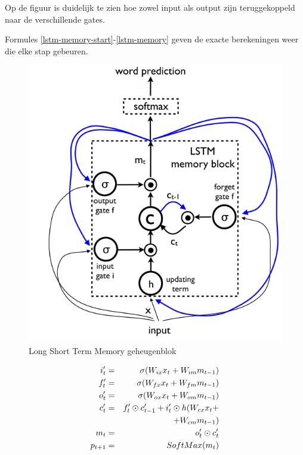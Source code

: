 Op de figuur is duidelijk te zien hoe zowel input als output zijn teruggekoppeld naar de verschillende gates. 

Formules \eqref{lstm-memory-start}-\eqref{lstm-memory} geven de exacte berekeningen weer die elke stap gebeuren. 

\begin{figure}[tb]
    \centering
    \includegraphics[width=\linewidth]{Images/lstm.PNG}
    \caption{Long Short Term Memory geheugenblok}
    \label{fig:lstm}
\end{figure}

\begin{eqnarray}
\vspace{-3mm}
\label{lstm-memory-start}
i_t' & = & \sigma (W_{ix} x_t + W_{im} m_{t-1}) \label{lstm-input} \\
f_t' & = & \sigma (W_{fx} x_t + W_{fm} m_{t-1}) \\
o_t' & = & \sigma (W_{ox} x_t + W_{om} m_{t-1}) \\
c_t' & = & f_t' \odot c_{t-1}' + i_t' \odot h(W_{cx} x_t + \nonumber \\
&   & + W_{cm} m_{t-1}) \\
m_t & = & o_t' \odot c_t'\\
p_{t+1} & = & SoftMax(m_t)
\label{lstm-memory}
\vspace{-3mm}
\end{eqnarray}

